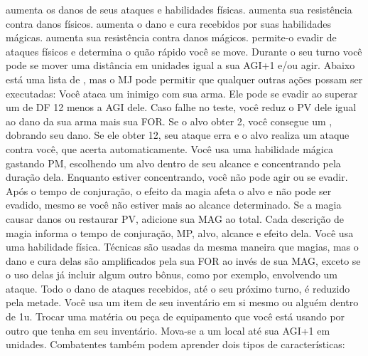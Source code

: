  aumenta os danos de seus ataques e habilidades físicas. \ofrow
{} aumenta sua resistência contra danos físicos. \ofrow
{} aumenta o dano e cura recebidos por suas habilidades mágicas. \ofrow
{} aumenta sua resistência contra danos mágicos. \ofrow
{} permite-o evadir de ataques físicos e determina o quão rápido você se move.
%
\newpage
%
Durante o seu turno você pode se mover uma distância em unidades igual a sua AGI+1 e/ou agir. 
Abaixo está uma lista de , mas o MJ pode permitir que qualquer outras ações possam ser executadas:
%
\vfill
%
Você ataca um inimigo com sua arma. 
Ele pode se evadir ao superar um  de DF 12 menos a AGI dele. 
Caso falhe no teste, você reduz o PV dele igual ao dano da sua arma mais sua FOR. 
Se o alvo obter 2, você consegue um , dobrando seu dano. 
Se ele obter 12, seu ataque erra e o alvo realiza um ataque contra você, que acerta automaticamente. \ofgap
%
Você usa uma habilidade mágica gastando PM, escolhendo um alvo dentro de seu alcance e concentrando pela duração dela. 
Enquanto estiver concentrando, você não pode agir ou se evadir. 
Após o tempo de conjuração, o efeito da magia afeta o alvo  e não pode ser evadido, mesmo se você não estiver mais ao alcance determinado.
Se a magia causar danos ou restaurar PV, adicione sua MAG ao total. 
Cada descrição de magia informa o tempo de conjuração, MP, alvo, alcance e efeito dela. \ofgap
%
Você usa uma habilidade física. 
Técnicas são usadas da mesma maneira que magias, mas o dano e cura delas são amplificados pela sua FOR ao invés de sua MAG, exceto se o uso delas já incluir algum outro bônus, como por exemplo, envolvendo um ataque. \ofgap
%
Todo o dano de ataques recebidos, até o seu próximo turno, é reduzido pela metade. \ofgap
%
Você usa um item de seu inventário em si mesmo ou alguém dentro de 1u. \ofgap
%
Trocar uma matéria ou peça de equipamento que você está usando por outro que tenha em seu inventário. \ofgap
%
Mova-se a um local até sua AGI+1 em unidades.
%
\vfill
%
Combatentes também podem aprender dois tipos de características:\vspace*{0.2cm}\\
